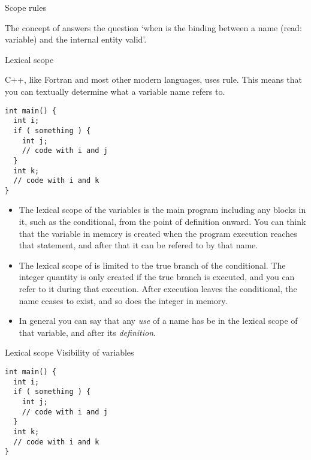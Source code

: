 
 {Scope rules}

The concept of  answers the question `when is the
binding between a name (read: variable) and the internal entity valid'.

 {Lexical scope}

C++, like Fortran and most other modern languages, uses
 rule. This means that you can textually
determine what a variable name refers to.
\begin{verbatim}
int main() {
  int i;
  if ( something ) {
    int j;
    // code with i and j
  }
  int k;
  // code with i and k
}
\end{verbatim}
\begin{itemize}
\item The lexical scope of the variables  is the main program
  including any blocks in it, such as the conditional, from the point
  of definition onward. You can think that the variable in memory is
  created when the program execution reaches that statement, and after
  that it can be refered to by that name.
\item The lexical scope of  is limited to the true branch of the
  conditional. The integer quantity is only created if the true branch
  is executed, and you can refer to it during that execution. After
  execution leaves the conditional, the name ceases to exist, and so
  does the integer in memory.
\item In general you can say that any
  \emph{use}
  of a name has be in the lexical scope of that variable, and after
  its \emph{definition}.
\end{itemize}

\begin{slide}{Lexical scope}
  \label{sl:lexical}
  Visibility of variables
\begin{verbatim}
int main() {
  int i;
  if ( something ) {
    int j;
    // code with i and j
  }
  int k;
  // code with i and k
}
\end{verbatim}  
\end{slide}

